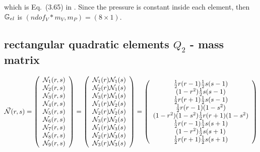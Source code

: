 which is Eq.~(3.65) in \textcite{elsw}.
Since the pressure is constant inside each element, then ${\mathbb{G}}_{el}$ is $(ndof_V*m_V,m_P)=(8\times 1)$.







\subsection{rectangular quadratic elements $Q_2$ - mass matrix} \label{app:qrqe}



\[
\vec{{\mathcal{N}}}(r,s) 
=
\left(
\begin{array}{c}
{\mathcal{N}}_1(r,s) \\ 
{\mathcal{N}}_2(r,s) \\
{\mathcal{N}}_3(r,s) \\
{\mathcal{N}}_4(r,s) \\
{\mathcal{N}}_5(r,s) \\
{\mathcal{N}}_6(r,s) \\
{\mathcal{N}}_7(r,s) \\
{\mathcal{N}}_8(r,s) \\
{\mathcal{N}}_9(r,s) 
\end{array}
\right)
=
\left(
\begin{array}{c}
{\mathcal{N}}_1(r) {\mathcal{N}}_1(s) \\
{\mathcal{N}}_2(r) {\mathcal{N}}_1(s) \\
{\mathcal{N}}_3(r) {\mathcal{N}}_1(s) \\
{\mathcal{N}}_1(r) {\mathcal{N}}_2(s) \\
{\mathcal{N}}_2(r) {\mathcal{N}}_2(s) \\
{\mathcal{N}}_3(r) {\mathcal{N}}_2(s) \\
{\mathcal{N}}_1(r) {\mathcal{N}}_3(s) \\
{\mathcal{N}}_2(r) {\mathcal{N}}_3(s) \\
{\mathcal{N}}_3(r) {\mathcal{N}}_3(s) 
\end{array}
\right)
=
\left(
\begin{array}{c}
 \frac{1}{2}r(r-1)  \frac{1}{2}s(s-1)\\
     (1-r^2)        \frac{1}{2}s(s-1)\\
 \frac{1}{2}r(r+1)  \frac{1}{2}s(s-1)\\
 \frac{1}{2}r(r-1)  (1-s^2)\\
     (1-r^2)        (1-s^2)
 \frac{1}{2}r(r+1)  (1-s^2)\\
 \frac{1}{2}r(r-1)  \frac{1}{2}s(s+1)\\
     (1-r^2)        \frac{1}{2}s(s+1)\\
 \frac{1}{2}r(r+1)  \frac{1}{2}s(s+1)\\
\end{array}
\right)
\]

